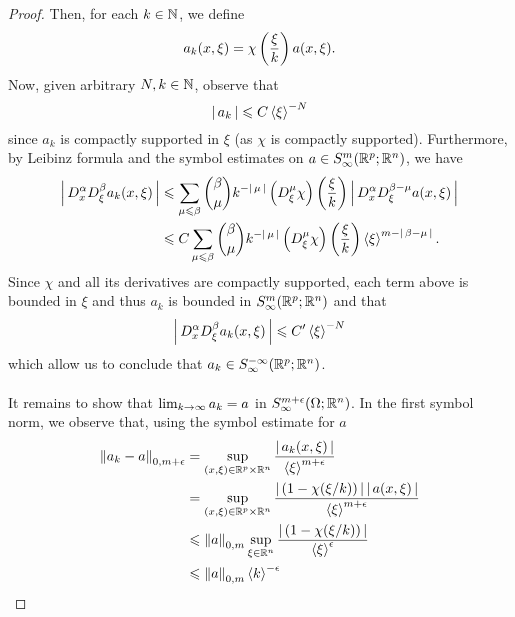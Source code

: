 \documentclass[12pt]{article}
\begin{document}
\begin{proof}
    Then, for each $k \in \N$, we define
    \[
    a_k(x, \xi) = \chi\brac{\frac{\xi}{k}} a (x, \xi). 
    \]
    Now, given arbitrary $N, k \in \N$, observe that 
    \[
    \abs{a_k} \leq C \sym[\xi]^{-N} 
    \]
    since $a_k$ is compactly supported in $\xi$ (as $\chi$ is compactly supported). Furthermore, by Leibinz formula and the symbol estimates on $a \in S^{m}_\infty(\R^p; \R^n)$, we have
    \begin{align*}
        \abs{D^\alpha_x D^\beta_\xi a_k(x, \xi)} 
        & \leq \sum_{\mu \leq \beta} \binom{\beta}{\mu}k^{-\abs{\mu}} \brac{D^\mu_\xi \chi}\brac{\frac{\xi}{k}} \abs{D^\alpha_x D^{\beta - \mu}_\xi a(x, \xi) } \\
        & \leq C \sum_{\mu \leq \beta} \binom{\beta}{\mu}k^{-\abs{\mu}} \brac{D^\mu_\xi \chi}\brac{\frac{\xi}{k}} \sym[\xi]^{m - \abs{\beta - \mu}}. 
    \end{align*}
    Since $\chi$ and all its derivatives are compactly supported, each term above is bounded in $\xi$ and thus $a_k$ is bounded in $S^{m}_\infty(\R^p; \R^n)$ and that 
    \[
    \abs{D^\alpha_x D^\beta_\xi a_k(x, \xi)} \leq C' \sym[\xi]^{-N}
    \]
    which allow us to conclude that $a_k \in S^{-\infty}_\infty(\R^p; \R^n)$.\\
    \\
    It remains to show that $\Lim[k] a_k = a $ in $S^{m + \epsilon}_\infty(\Omega; \R^n)$. In the first symbol norm, we observe that, using the symbol estimate for $a$ 
    \begin{align*}
        \norm[a_k - a]_{0, m + \epsilon} 
        & = \sup_{(x, \xi) \in \R^p \times \R^n} \frac{\abs{a_k(x, \xi)}}{\sym[\xi]^{m + \epsilon}} \\
        & = \sup_{(x, \xi) \in \R^p \times \R^n} \frac{\abs{(1- \chi(\xi/k))} \abs{a(x, \xi)}}{\sym[\xi]^{m + \epsilon}} \\
        & \leq \norm[a]_{0, m} \sup_{\xi \in \R^n} \frac{\abs{(1- \chi(\xi/k))}}{\sym[\xi]^{\epsilon}} \\
        & \leq \norm[a]_{0, m} \sym[k]^{- \epsilon}\\

\end{align*}
\end{proof}
\end{document}
